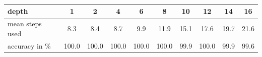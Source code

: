 \begin{tabular}{lccccccccc}
\toprule
depth & 1 & 2 & 4 & 6 & 8 & 10 & 12 & 14 & 16 \\
\midrule
mean steps used & 8.3 & 8.4 & 8.7 & 9.9 & 11.9 & 15.1 & 17.6 & 19.7 & 21.6 \\
accuracy in \% & 100.0 & 100.0 & 100.0 & 100.0 & 100.0 & 99.9 & 100.0 & 99.9 & 99.6 \\
\bottomrule
\end{tabular}
